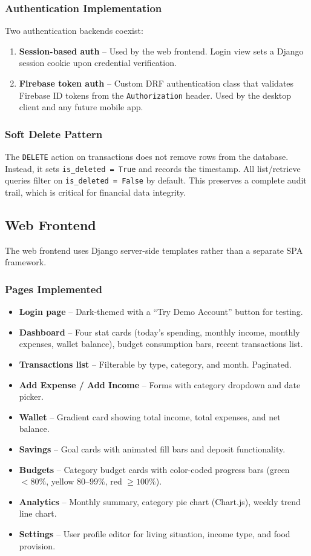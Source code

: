 \documentclass[12pt,a4paper]{article}
\begin{document}
\subsubsection{Authentication Implementation}
Two authentication backends coexist:
\begin{enumerate}
  \item \textbf{Session-based auth} -- Used by the web frontend. Login view sets a Django session cookie upon credential verification.
  \item \textbf{Firebase token auth} -- Custom DRF authentication class that validates Firebase ID tokens from the \texttt{Authorization} header. Used by the desktop client and any future mobile app.
\end{enumerate}

\subsubsection{Soft Delete Pattern}
The \texttt{DELETE} action on transactions does not remove rows from the database.
Instead, it sets \texttt{is\_deleted = True} and records the timestamp.
All list/retrieve queries filter on \texttt{is\_deleted = False} by default.
This preserves a complete audit trail, which is critical for financial data integrity.

\subsection{Web Frontend}

The web frontend uses Django server-side templates rather than a separate SPA framework.

\subsubsection{Pages Implemented}
\begin{itemize}
  \item \textbf{Login page} -- Dark-themed with a ``Try Demo Account'' button for testing.
  \item \textbf{Dashboard} -- Four stat cards (today's spending, monthly income, monthly expenses, wallet balance), budget consumption bars, recent transactions list.
  \item \textbf{Transactions list} -- Filterable by type, category, and month. Paginated.
  \item \textbf{Add Expense / Add Income} -- Forms with category dropdown and date picker.
  \item \textbf{Wallet} -- Gradient card showing total income, total expenses, and net balance.
  \item \textbf{Savings} -- Goal cards with animated fill bars and deposit functionality.
  \item \textbf{Budgets} -- Category budget cards with color-coded progress bars (green $<80\%$, yellow $80$--$99\%$, red $\geq 100\%$).
  \item \textbf{Analytics} -- Monthly summary, category pie chart (Chart.js), weekly trend line chart.
  \item \textbf{Settings} -- User profile editor for living situation, income type, and food provision.
\end{itemize}
\end{document}
